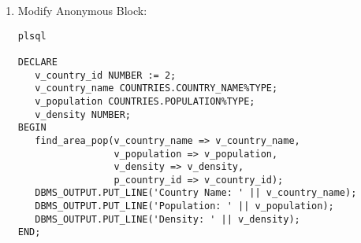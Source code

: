 \documentclass[11pt]{article}
\begin{document}
\begin{enumerate}
\begin{enumerate}
\item Modify Anonymous Block:
\begin{verbatim}
plsql

DECLARE
   v_country_id NUMBER := 2;
   v_country_name COUNTRIES.COUNTRY_NAME%TYPE;
   v_population COUNTRIES.POPULATION%TYPE;
   v_density NUMBER;
BEGIN
   find_area_pop(v_country_name => v_country_name,
                 v_population => v_population,
                 v_density => v_density,
                 p_country_id => v_country_id);
   DBMS_OUTPUT.PUT_LINE('Country Name: ' || v_country_name);
   DBMS_OUTPUT.PUT_LINE('Population: ' || v_population);
   DBMS_OUTPUT.PUT_LINE('Density: ' || v_density);
END;
\end{verbatim}
\end{enumerate}
\end{enumerate}
\end{document}
